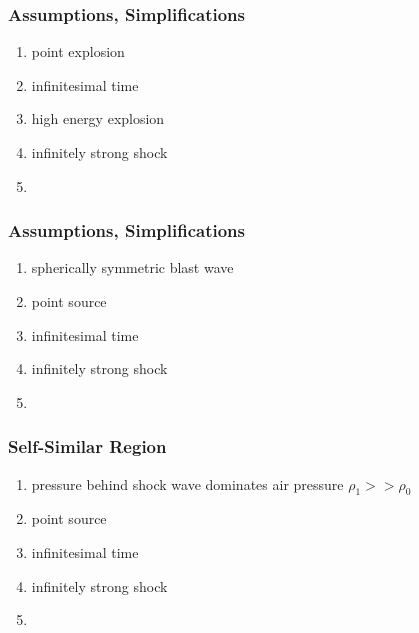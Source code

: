 \begin{frame}\frametitle{Assumptions, Simplifications}
\begin{enumerate}
	\item point explosion
	\item infinitesimal time
	\item high energy explosion
	\item infinitely strong shock
	\item 
\end{enumerate}
\end{frame}

\begin{frame}\frametitle{Assumptions, Simplifications}
\begin{enumerate}
	\item spherically symmetric blast wave
	\item point source
	\item infinitesimal time
	\item infinitely strong shock
	\item 
\end{enumerate}
\end{frame}

%
\begin{frame}\frametitle{Self-Similar Region}
\begin{enumerate}
	\item pressure behind shock wave dominates air pressure $\rho_{1} >> \rho_0$
	\item point source
	\item infinitesimal time
	\item infinitely strong shock
	\item 
\end{enumerate}
\end{frame}
%


\endinput  %
``''
Buckingham's Pi theorem, also known as the Buckingham π theorem, is a fundamental principle in dimensional analysis and fluid mechanics. It provides a method for determining the relationship between physical quantities in terms of their dimensions. The theorem is particularly useful when dealing with complex physical systems where multiple variables are involved.

The theorem states that if there is a physical relationship between 'n' variables involving 'm' fundamental dimensions (such as length, mass, time, etc.), then the relationship can be expressed in terms of 'n - m' dimensionless groups. These dimensionless groups are formed by combining the original variables in a way that eliminates the dimensions.

